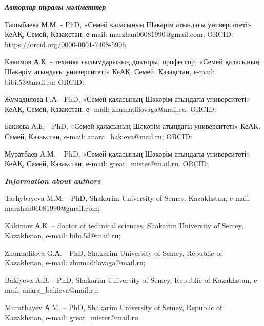 \begin{authorinfo}
\emph{{\bfseries Авторлар туралы мәліметтер}}

Ташыбаева М.М. - PhD, «Семей қаласының Шәкәрім атындағы университеті»
КеАҚ, Семей, Қазақстан, е-mail:
marzhan06081990@gmail.com;
ORCID: \url{https://orcid.org/0000-0001-7408-5906}

Какимов А.К. - техника ғылымдарының докторы, профессор, «Семей қаласының
Шәкәрім атындағы университеті» КеАҚ, Семей, Қазақстан, е-mail:
bibi.53@mail.ru; ORCID:
\href{https://orcid.org/0000-0002-9607-1684}{}

Жумадилова Г.А - PhD, «Семей қаласының Шәкәрім атындағы университеті»
КеАҚ, Семей, Қазақстан, е- mail:
zhumadilovaga@mail.ru; ORCID:
\href{https://orcid.org/0000-0003-0722-8860}{}

Бакиева А.Б. - PhD, «Семей қаласының Шәкәрім атындағы университеті»
КеАҚ, Семей, Қазақстан, e-mail:
anara\_bakieva@mail.ru; ORCID:
\href{https://orcid.org/0009-0003-5904-1253}{}

Муратбаев А.М. -- PhD, «Семей қаласының Шәкәрім атындағы университеті»
КеАҚ, Семей, Қазақстан, е-mail:
great\_mister@mail.ru. ORCID:
\href{https://orcid.org/0000-0002-0830-5007}{}

\emph{{\bfseries Information about authors}}

Tashybayeva M.М. - PhD, Shakarim University of Semey, Kazakhstan,
e-mail:
marzhan06081990@gmail.com;

Kakimov А.К. -- doctor of technical sciences, Shakarim University of
Semey, Kazakhstan, e-mail:
bibi.53@mail.ru;

Zhumadilova G.А. - PhD, Shakarim University of Semey, Republic of
Kazakhstan, e-mail: zhumadilovaga@mail.ru;

Bakiyeva A.B. - PhD, Shakarim University of Semey, Republic of
Kazakhstan, e-mail:
anara\_bakieva@mail.ru;

Muratbayev А.M. -- PhD, Shakarim University of Semey, Republic of
Kazakhstan, e-mail: great\_mister@mail.ru.\
\end{authorinfo}
